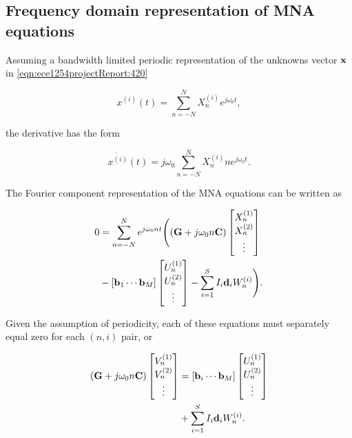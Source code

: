\subsection{Frequency domain representation of MNA equations}

Assuming a bandwidth limited periodic representation of the unknowns vector \( \mathbf{x} \) in \cref{eqn:ece1254projectReport:420}

\begin{equation}\label{eqn:ece1254projectReport:500}
x^{(i)}(t) = \sum_{n=-N}^N X_n^{(i)} e^{j \omega_0 t},
\end{equation}

the derivative has the form

\begin{equation}\label{eqn:ece1254projectReport:520}
\dot{x^{(i)}}(t) = j \omega_0 \sum_{n=-N}^N X_n^{(i)} n e^{j \omega_0 t}.
\end{equation}

The Fourier component representation of the MNA equations can be written as

\begin{equation}\label{eqn:ece1254projectReport:600}
\begin{aligned}
0 &= \sum_{n = -N}^N e^{j \omega_0 n t}
\Biglr{
   \lr{ \BG + j \omega_0 n \BC }
\begin{bmatrix}
X_n^{(1)} \\
X_n^{(2)} \\
\vdots \\
\end{bmatrix} \\
&-
[ \Bb_1 \cdots \Bb_M ]
\begin{bmatrix}
U_n^{(1)} \\
U_n^{(2)} \\
\vdots \\
\end{bmatrix}
- \sum_{i = 1}^S I_i \Bd_i
W_n^{(i)}
}.
\end{aligned}
\end{equation}

Given the
assumption of periodicity, each of these equations must separately equal zero for each \( ( n, i ) \) pair, or

\begin{equation}\label{eqn:ece1254projectReport:540}
\begin{aligned}
\lr{
\BG + j \omega_0 n \BC
}
\begin{bmatrix}
V_n^{(1)} \\
V_n^{(2)} \\
\vdots \\
\end{bmatrix}
&=
[\Bb_i \cdots \Bb_M]
\begin{bmatrix}
U_n^{(1)} \\
U_n^{(2)} \\
\vdots \\
\end{bmatrix} \\
&+ \sum_{i = 1}^S I_i \Bd_i
W_n^{(i)}
.
\end{aligned}
\end{equation}


